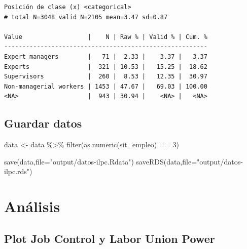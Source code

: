 \documentclass[
  letterpaper,
  DIV=11,
  numbers=noendperiod]{scrreprt}
\newenvironment{Shaded}{\begin{snugshade}}{\end{snugshade}}
\newcommand{\AttributeTok}[1]{\textcolor[rgb]{0.40,0.45,0.13}{#1}}
\newcommand{\DecValTok}[1]{\textcolor[rgb]{0.68,0.00,0.00}{#1}}
\newcommand{\FunctionTok}[1]{\textcolor[rgb]{0.28,0.35,0.67}{#1}}
\newcommand{\NormalTok}[1]{\textcolor[rgb]{0.00,0.23,0.31}{#1}}
\newcommand{\OtherTok}[1]{\textcolor[rgb]{0.00,0.23,0.31}{#1}}
\newcommand{\SpecialCharTok}[1]{\textcolor[rgb]{0.37,0.37,0.37}{#1}}
\newcommand{\StringTok}[1]{\textcolor[rgb]{0.13,0.47,0.30}{#1}}
\begin{document}
\begin{verbatim}
Posición de clase (x) <categorical> 
# total N=3048 valid N=2105 mean=3.47 sd=0.87

Value                  |    N | Raw % | Valid % | Cum. %
--------------------------------------------------------
Expert managers        |   71 |  2.33 |    3.37 |   3.37
Experts                |  321 | 10.53 |   15.25 |  18.62
Supervisors            |  260 |  8.53 |   12.35 |  30.97
Non-managerial workers | 1453 | 47.67 |   69.03 | 100.00
<NA>                   |  943 | 30.94 |    <NA> |   <NA>
\end{verbatim}

\hypertarget{guardar-datos}{%
\section{Guardar datos}\label{guardar-datos}}

\begin{Shaded}
\begin{Highlighting}[]
\NormalTok{data }\OtherTok{\textless{}{-}}\NormalTok{ data }\SpecialCharTok{\%\textgreater{}\%} 
  \FunctionTok{filter}\NormalTok{(}\FunctionTok{as.numeric}\NormalTok{(sit\_empleo) }\SpecialCharTok{==} \DecValTok{3}\NormalTok{)}
\end{Highlighting}
\end{Shaded}

\begin{Shaded}
\begin{Highlighting}[]
\FunctionTok{save}\NormalTok{(data,}\AttributeTok{file=}\StringTok{"output/datos{-}ilpc.Rdata"}\NormalTok{)}
\FunctionTok{saveRDS}\NormalTok{(data,}\AttributeTok{file=}\StringTok{"output/datos{-}ilpc.rds"}\NormalTok{)}
\end{Highlighting}
\end{Shaded}


\hypertarget{anuxe1lisis}{%
\chapter{Análisis}\label{anuxe1lisis}}

\hypertarget{plot-job-control-y-labor-union-power}{%
\section{Plot Job Control y Labor Union
Power}\label{plot-job-control-y-labor-union-power}}
\end{document}
